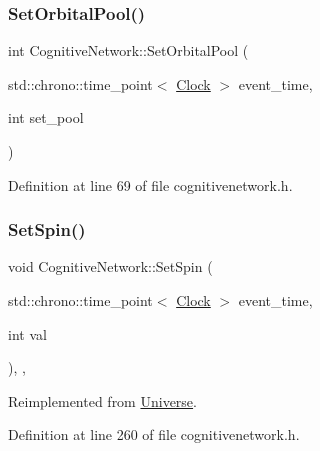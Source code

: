 \subsubsection{\texorpdfstring{Set\+Orbital\+Pool()}{SetOrbitalPool()}}
{\footnotesize\ttfamily int Cognitive\+Network\+::\+Set\+Orbital\+Pool (\begin{DoxyParamCaption}\item[{std\+::chrono\+::time\+\_\+point$<$ \hyperlink{universe_8h_a0ef8d951d1ca5ab3cfaf7ab4c7a6fd80}{Clock} $>$}]{event\+\_\+time,  }\item[{int}]{set\+\_\+pool }\end{DoxyParamCaption})\hspace{0.3cm}{\ttfamily [inline]}}



Definition at line 69 of file cognitivenetwork.\+h.

\mbox{\label{class_cognitive_network_a3fc6d08413bfd4350f94d6f2627eedc7}} 
\subsubsection{\texorpdfstring{Set\+Spin()}{SetSpin()}}
{\footnotesize\ttfamily void Cognitive\+Network\+::\+Set\+Spin (\begin{DoxyParamCaption}\item[{std\+::chrono\+::time\+\_\+point$<$ \hyperlink{universe_8h_a0ef8d951d1ca5ab3cfaf7ab4c7a6fd80}{Clock} $>$}]{event\+\_\+time,  }\item[{int}]{val }\end{DoxyParamCaption})\hspace{0.3cm}{\ttfamily [inline]}, {\ttfamily [final]}, {\ttfamily [virtual]}}



Reimplemented from \hyperlink{class_universe_ae2ae1c3b3e4cde2c18f5f6a814761ec8}{Universe}.



Definition at line 260 of file cognitivenetwork.\+h.

\mbox{\label{class_cognitive_network_a50f2a12c9873e623d6247318b041ba30}} 
